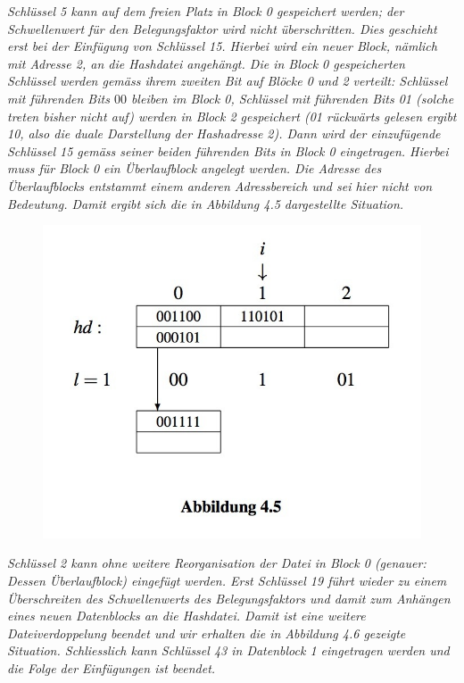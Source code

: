 \documentclass[a4paper]{book}
\begin{document}
\emph{Schlüssel 5 kann auf dem freien Platz in Block 0 gespeichert werden; der Schwellenwert für den Belegungsfaktor wird nicht überschritten. Dies geschieht erst bei der Einfügung von Schlüssel 15. Hierbei wird ein neuer Block, nämlich mit Adresse 2, an die Hashdatei angehängt. Die in Block 0 
gespeicherten Schlüssel werden gemäss ihrem zweiten Bit auf Blöcke 0 und 2 verteilt: Schlüssel mit führenden Bits $00$ bleiben im Block 0, Schlüssel mit führenden Bits 01 (solche treten bisher nicht auf) werden in Block 2 gespeichert (01 rückwärts gelesen ergibt 10, also die duale Darstellung der 
Hashadresse 2). Dann wird der einzufügende Schlüssel 15 gemäss seiner beiden führenden Bits in Block 0 eingetragen. Hierbei muss für Block 0 ein Überlaufblock angelegt werden. Die Adresse des Überlaufblocks entstammt einem anderen Adressbereich und sei hier nicht von Bedeutung. Damit 
ergibt sich die in Abbildung 4.5 dargestellte Situation.}
\begin{figure}[H]
\centering
\includegraphics[scale=0.3]{Figures/bsp4.jpg}
\end{figure}
\emph{Schlüssel 2 kann ohne weitere Reorganisation der Datei in Block 0 (genauer: Dessen Überlaufblock) eingefügt werden. Erst Schlüssel 19 führt wieder zu einem Überschreiten des Schwellenwerts des Belegungsfaktors und damit zum Anhängen eines neuen Datenblocks an die Hashdatei. Damit ist eine weitere Dateiverdoppelung beendet und wir erhalten die in Abbildung 4.6 gezeigte Situation.
Schliesslich kann Schlüssel 43 in Datenblock 1 eingetragen werden und die Folge der Einfügungen ist beendet.}
\end{document}
